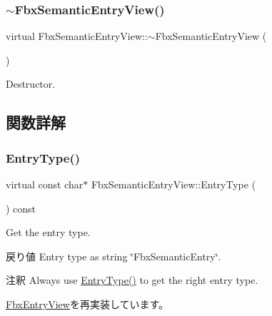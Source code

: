 \subsubsection{\texorpdfstring{$\sim$\+Fbx\+Semantic\+Entry\+View()}{~FbxSemanticEntryView()}}
{\footnotesize\ttfamily virtual Fbx\+Semantic\+Entry\+View\+::$\sim$\+Fbx\+Semantic\+Entry\+View (\begin{DoxyParamCaption}{ }\end{DoxyParamCaption})\hspace{0.3cm}{\ttfamily [virtual]}}



Destructor. 



\subsection{関数詳解}
\mbox{\label{class_fbx_semantic_entry_view_afd242ecac3eaab584dffe108753aba1d}} 
\subsubsection{\texorpdfstring{Entry\+Type()}{EntryType()}}
{\footnotesize\ttfamily virtual const char$\ast$ Fbx\+Semantic\+Entry\+View\+::\+Entry\+Type (\begin{DoxyParamCaption}{ }\end{DoxyParamCaption}) const\hspace{0.3cm}{\ttfamily [virtual]}}

Get the entry type. \begin{DoxyReturn}{戻り値}
Entry type as string \char`\"{}\+Fbx\+Semantic\+Entry\char`\"{}. 
\end{DoxyReturn}
\begin{DoxyRemark}{注釈}
Always use \hyperlink{class_fbx_semantic_entry_view_afd242ecac3eaab584dffe108753aba1d}{Entry\+Type()} to get the right entry type. 
\end{DoxyRemark}


\hyperlink{class_fbx_entry_view_a83ee50482b441ba8b0e6d7c2dba5432f}{Fbx\+Entry\+View}を再実装しています。

\mbox{\label{class_fbx_semantic_entry_view_a9163df1576880dd1fa1922eeeb122dfd}} 
